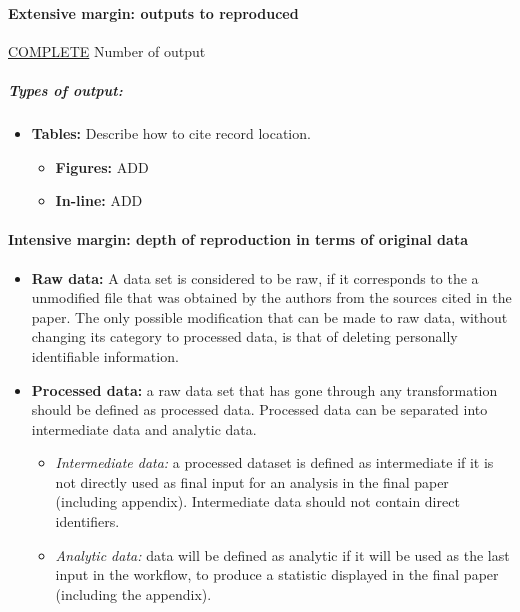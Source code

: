 \documentclass[]{book}
\providecommand{\tightlist}{%
  \setlength{\itemsep}{0pt}\setlength{\parskip}{0pt}}
\let\oldparagraph\paragraph
\renewcommand{\paragraph}[1]{\oldparagraph{#1}\mbox{}}
\let\oldsubparagraph\subparagraph
\renewcommand{\subparagraph}[1]{\oldsubparagraph{#1}\mbox{}}
\begin{document}
\hypertarget{outputs}{%
\paragraph{Extensive margin: outputs to reproduced}\label{outputs}}

\protect\hyperlink{complete}{COMPLETE}
Number of output

\hypertarget{types-of-output}{%
\subparagraph{Types of output:}\label{types-of-output}}

\begin{itemize}
\tightlist
\item
  \textbf{Tables:} Describe how to cite record location.

  \begin{itemize}
  \tightlist
  \item
    \textbf{Figures:} ADD\\
  \item
    \textbf{In-line:} ADD
  \end{itemize}
\end{itemize}

\hypertarget{intensive}{%
\paragraph{Intensive margin: depth of reproduction in terms of original data}\label{intensive}}

\begin{itemize}
\item
  \textbf{Raw data:} A data set is considered to be raw, if it corresponds to the a unmodified file that was obtained by the authors from the sources cited in the paper. The only possible modification that can be made to raw data, without changing its category to processed data, is that of deleting personally identifiable information.
\item
  \textbf{Processed data:} a raw data set that has gone through any transformation should be defined as processed data. Processed data can be separated into intermediate data and analytic data.

  \begin{itemize}
  \tightlist
  \item
    \emph{Intermediate data:} a processed dataset is defined as intermediate if it is not directly used as final input for an analysis in the final paper (including appendix). Intermediate data should not contain direct identifiers.
  \item
    \emph{Analytic data:} data will be defined as analytic if it will be used as the last input in the workflow, to produce a statistic displayed in the final paper (including the appendix).
  \end{itemize}
\end{itemize}
\end{document}

